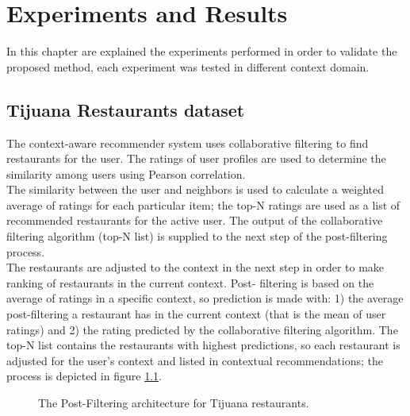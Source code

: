 \chapter{Experiments and Results} \label{sec:5}


In this chapter are explained the experiments performed in order to
validate the proposed method, each experiment was tested in different
context domain.

\section{Tijuana Restaurants dataset} 

The context-aware recommender system  
uses collaborative filtering to find restaurants for the
user\cite{ramirez2013restaurant}. The ratings of user profiles are
used to determine the similarity among users using Pearson correlation. \\   
The similarity between the user and  neighbors is used to calculate a
weighted average of ratings for each particular item;  the top-N
ratings are used as a list of recommended restaurants for the active
user. The output of the collaborative filtering algorithm (top-N list)
is supplied to the next step of the post-filtering process. \\   The
restaurants are adjusted to the context in the next step in order to
make ranking of restaurants in the current context. Post- filtering is
based on the average of ratings in a specific context, so prediction
is made with: 1) the average post-filtering a restaurant has in the
current context (that is the mean of user ratings) and 2) the rating
predicted by the collaborative filtering algorithm. The top-N list
contains the restaurants with highest predictions, so each restaurant
is adjusted for the user’s context and listed in contextual
recommendations; the process is depicted in figure
\ref{fig:postfiltering}.
\begin{figure}
\centering
\captionsetup{font=footnotesize}
\setlength\fboxsep{0pt}
\caption{The Post-Filtering architecture for Tijuana restaurants.}
\label{fig:postfiltering}     
\end{figure}

